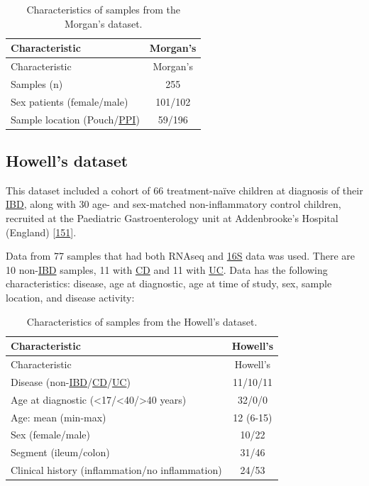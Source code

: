 \documentclass[
  12pt,
  a4paper,
  twoside,
  openright]{book}
\begin{document}
\begin{longtable}[]{@{}lc@{}}
\caption{\label{tab:Morgan} Characteristics of samples from the Morgan's dataset.}\tabularnewline
\toprule
Characteristic & Morgan's \\
\midrule
\endfirsthead
\toprule
Characteristic & Morgan's \\
\midrule
\endhead
Samples (n) & 255 \\
Sex patients (female/male) & 101/102 \\
Sample location (Pouch/\protect\hyperlink{acronyms_PPI}{PPI}) & 59/196 \\
\bottomrule
\end{longtable}

\hypertarget{methods-howell}{%
\subsection{Howell's dataset}\label{methods-howell}}

This dataset included a cohort of 66 treatment-naïve children at diagnosis of their \protect\hyperlink{acronyms_IBD}{IBD}, along with 30 age- and sex-matched non-inflammatory control children, recruited at the Paediatric Gastroenterology unit at Addenbrooke's Hospital (England) {[}\protect\hyperlink{ref-howell2018}{151}{]}.

Data from 77 samples that had both RNAseq and \protect\hyperlink{acronyms_16S}{16S} data was used.
There are 10 non-\protect\hyperlink{acronyms_IBD}{IBD} samples, 11 with \protect\hyperlink{acronyms_CD}{CD} and 11 with \protect\hyperlink{acronyms_UC}{UC}.
Data has the following characteristics: disease, age at diagnostic, age at time of study, sex, sample location, and disease activity:

\begin{longtable}[]{@{}lc@{}}
\caption{\label{tab:howell} Characteristics of samples from the Howell's dataset.}\tabularnewline
\toprule
Characteristic & Howell's \\
\midrule
\endfirsthead
\toprule
Characteristic & Howell's \\
\midrule
\endhead
Disease (non-\protect\hyperlink{acronyms_IBD}{IBD}/\protect\hyperlink{acronyms_CD}{CD}/\protect\hyperlink{acronyms_UC}{UC}) & 11/10/11 \\
Age at diagnostic (\textless17/\textless40/\textgreater40 years) & 32/0/0 \\
Age: mean (min-max) & 12 (6-15) \\
Sex (female/male) & 10/22 \\
Segment (ileum/colon) & 31/46 \\
Clinical history (inflammation/no inflammation) & 24/53 \\
\bottomrule
\end{longtable}
\end{document}
